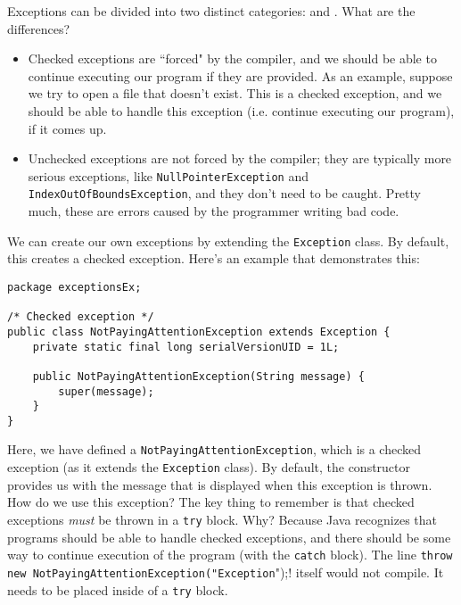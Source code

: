 Exceptions can be divided into two distinct categories:  and . What are the differences?
\begin{itemize}
    \item Checked exceptions are ``forced" by the compiler, and we should be able to continue executing our program if they are provided. As an example, suppose we try to open a file that doesn't exist. This is a checked exception, and we should be able to handle this exception (i.e. continue executing our program), if it comes up. 
    \item Unchecked exceptions are not forced by the compiler; they are typically more serious exceptions, like \verb!NullPointerException! and \verb!IndexOutOfBoundsException!, and they don't need to be caught. Pretty much, these are errors caused by the programmer writing bad code.
\end{itemize}

We can create our own exceptions by extending the \verb!Exception! class. By default, this creates a checked exception. Here's an example that demonstrates this:

\begin{lstlisting}
package exceptionsEx;

/* Checked exception */
public class NotPayingAttentionException extends Exception {
	private static final long serialVersionUID = 1L;

	public NotPayingAttentionException(String message) {
		super(message);
	}
}
\end{lstlisting}

Here, we have defined a \verb!NotPayingAttentionException!, which is a checked exception (as it extends the \verb!Exception! class). By default, the constructor provides us with the message that is displayed when this exception is thrown. How do we use this exception? The key thing to remember is that checked exceptions \textit{must} be thrown in a \verb!try! block. Why? Because Java recognizes that programs should be able to handle checked exceptions, and there should be some way to continue execution of the program (with the \verb!catch! block). The line \verb!throw new NotPayingAttentionException("Exception!");! itself would not compile. It needs to be placed inside of a \verb!try! block.